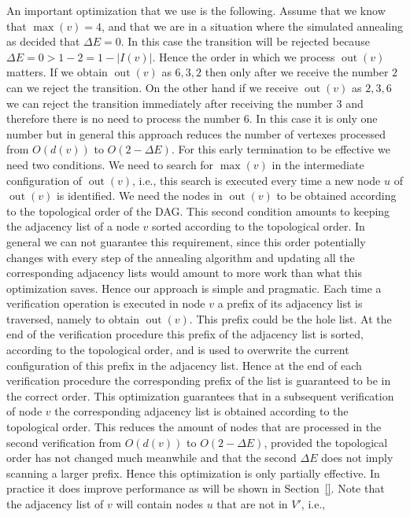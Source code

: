 \documentclass[a4paper]{article}
\DeclareMathOperator{\out}{out}
\begin{document}
An important optimization that we use is the following. Assume that we know
that $\max(v) = 4$, and that we are in a situation where the simulated
annealing as decided that $\Delta E = 0$. In this case the transition will
be rejected because $\Delta E = 0 > 1-2 = 1 - |I(v)|$. Hence the order in
which we process $\out(v)$ matters. If we obtain $\out(v)$ as $6, 3, 2$
then only after we receive the number $2$ can we reject the transition. On
the other hand if we receive $\out(v)$ as $2, 3, 6$ we can reject the
transition immediately after receiving the number $3$ and therefore there
is no need to process the number $6$. In this case it is only one number
but in general this approach reduces the number of vertexes processed from
$O(d(v))$ to $O(2 - \Delta E)$. For this early termination to be effective
we need two conditions. We need to search for $\max(v)$ in the intermediate
configuration of $\out(v)$, i.e., this search is executed every time a new
node $u$ of $\out(v)$ is identified. We need the nodes in $\out(v)$ to be
obtained according to the topological order of the DAG. This second
condition amounts to keeping the adjacency list of a node $v$ sorted
according to the topological order. In general we can not guarantee this
requirement, since this order potentially changes with every step of the
annealing algorithm and updating all the corresponding adjacency lists
would amount to more work than what this optimization saves. Hence our
approach is simple and pragmatic. Each time a verification operation is
executed in node $v$ a prefix of its adjacency list is traversed, namely to
obtain $\out(v)$. This prefix could be the hole list. At the end of the
verification procedure this prefix of the adjacency list is sorted,
according to the topological order, and is used to overwrite the current
configuration of this prefix in the adjacency list. Hence at the end of
each verification procedure the corresponding prefix of the list is
guaranteed to be in the correct order. This optimization guarantees that in
a subsequent verification of node $v$ the corresponding adjacency list is
obtained according to the topological order. This reduces the amount of
nodes that are processed in the second verification from $O(d(v))$ to
$O(2 - \Delta E)$, provided the topological order has not changed much
meanwhile and that the second $\Delta E$ does not imply scanning a larger
prefix. Hence this optimization is only partially effective. In practice it
does improve performance as will be shown in Section~\ref{}. Note that the
adjacency list of $v$ will contain nodes $u$ that are not in $V'$, i.e.,
\end{document}
